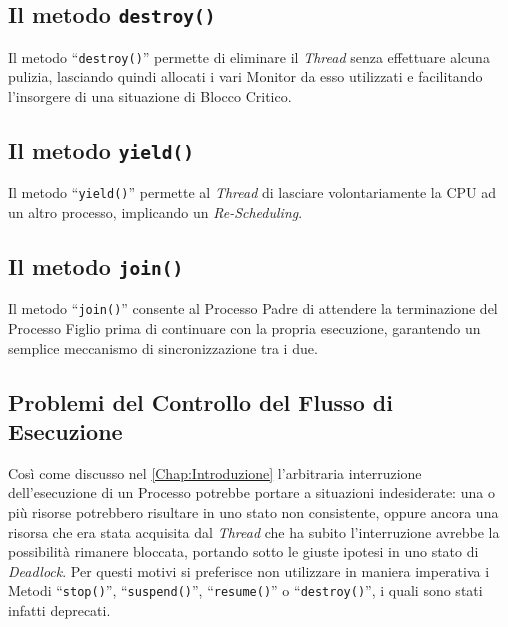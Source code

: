 \subsection*{Il metodo \texttt{destroy()}}
Il metodo ``\texttt{destroy()}'' permette di eliminare il \textit{Thread} senza effettuare alcuna pulizia, lasciando quindi allocati i vari Monitor da esso utilizzati e facilitando l'insorgere di una situazione di Blocco Critico.
\subsection*{Il metodo \texttt{yield()}}
Il metodo ``\texttt{yield()}'' permette al \textit{Thread} di lasciare volontariamente la CPU ad un altro processo, implicando un \textit{Re-Scheduling}.
\subsection*{Il metodo \texttt{join()}}
Il metodo ``\texttt{join()}'' consente al Processo Padre di attendere la terminazione del Processo Figlio prima di continuare con la propria esecuzione, garantendo un semplice meccanismo di sincronizzazione tra i due.

\subsection{Problemi del Controllo del Flusso di Esecuzione}
Così come discusso nel \autoref{Chap:Introduzione} l'arbitraria interruzione dell'esecuzione di un Processo potrebbe portare a situazioni indesiderate: una o più risorse potrebbero risultare in uno stato non consistente, oppure ancora una risorsa che era stata acquisita dal \textit{Thread} che ha subito l'interruzione avrebbe la possibilità rimanere bloccata, portando sotto le giuste ipotesi in uno stato di \textit{Deadlock}. Per questi motivi si preferisce non utilizzare in maniera imperativa i Metodi ``\texttt{stop()}'', ``\texttt{suspend()}'', ``\texttt{resume()}'' o ``\texttt{destroy()}'', i quali sono stati infatti deprecati. \par
